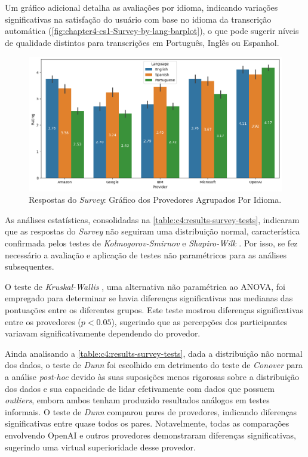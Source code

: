 Um gráfico adicional detalha as avaliações por idioma, indicando variações significativas na satisfação do usuário com base no idioma da transcrição automática (\autoref{fig:chapter4-cs1-Survey-by-lang-barplot}), o que pode sugerir níveis de qualidade distintos para transcrições em Português, Inglês ou Espanhol.

\begin{figure}[htb]
\centering
\caption{Respostas do \textit{Survey}: Gráfico dos Provedores Agrupados Por Idioma.}
\label{fig:chapter4-cs1-Survey-by-lang-barplot}
\includegraphics[width=1\textwidth]{images/chapter4-cs1-survey-by-lang-barplot.png}
\end{figure}

As análises estatísticas, consolidadas na \autoref{table:c4:results-survey-tests}, indicaram que as respostas do \textit{Survey} não seguiram uma distribuição normal, característica confirmada pelos testes de \textit{Kolmogorov-Smirnov} \cite{Kolmogorov1933,Smirnov1948} e \textit{Shapiro-Wilk} \cite{Shapiro1965}. Por isso, se fez necessário a avaliação e aplicação de testes não paramétricos para as análises subsequentes. 

O teste de \textit{Kruskal-Wallis} \cite{Kruskal1952}, uma alternativa não paramétrica ao ANOVA, foi empregado para determinar se havia diferenças significativas nas medianas das pontuações entre os diferentes grupos. Este teste mostrou diferenças significativas entre os provedores (\ensuremath{p < 0.05}), sugerindo que as percepções dos participantes variavam significativamente dependendo do provedor.

Ainda analisando a \autoref{table:c4:results-survey-tests}, dada a distribuição não normal dos dados, o teste de \textit{Dunn} \cite{Dunn1964} foi escolhido em detrimento do teste de \textit{Conover} \cite{Conover1999} para a análise \textit{post-hoc} devido às suas suposições menos rigorosas sobre a distribuição dos dados e sua capacidade de lidar efetivamente com dados que possuem \textit{outliers}, embora ambos tenham produzido resultados análogos em testes informais. O teste de \textit{Dunn} comparou pares de provedores, indicando diferenças significativas entre quase todos os pares. Notavelmente, todas as comparações envolvendo OpenAI e outros provedores demonstraram diferenças significativas, sugerindo uma virtual superioridade desse provedor.

